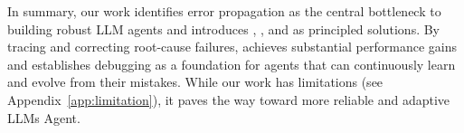 In summary, our work identifies error propagation as the central bottleneck to building robust LLM agents and introduces \AET{}, \Bench{}, and \ModelName{} as principled solutions. By tracing and correcting root-cause failures, \ModelName{} achieves substantial performance gains and establishes debugging as a foundation for agents that can continuously learn and evolve from their mistakes. While our work has limitations (see Appendix~\ref{app:limitation}), it paves the way toward more reliable and adaptive LLMs Agent.
